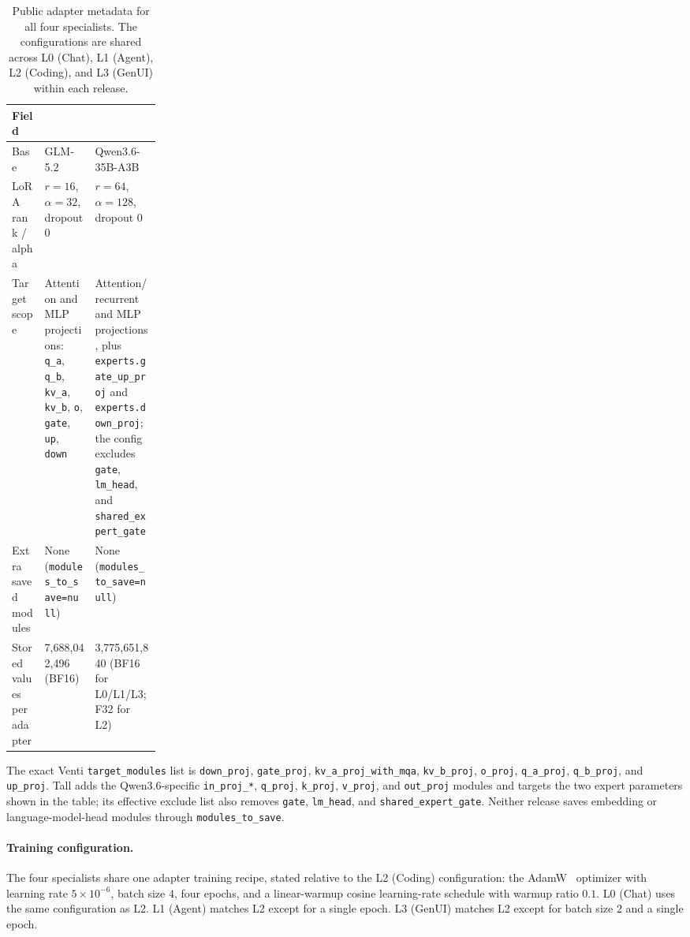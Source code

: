 \begin{table}[H]
\centering
\caption{Public adapter metadata for all four specialists. The configurations
are shared across L0 (Chat), L1 (Agent), L2 (Coding), and L3 (GenUI) within each
release.}
\label{tab:public_adapter_config}
\scriptsize
\begin{tabularx}{\linewidth}{@{}L{0.22\linewidth}YY@{}}
\toprule
Field & \venti{} & \tall{} \\
\midrule
Base & GLM-5.2 & Qwen3.6-35B-A3B \\
LoRA rank / alpha & $r=16$, $\alpha=32$, dropout $0$ & $r=64$, $\alpha=128$, dropout $0$ \\
Target scope & Attention and MLP projections: \texttt{q\_a}, \texttt{q\_b}, \texttt{kv\_a}, \texttt{kv\_b}, \texttt{o}, \texttt{gate}, \texttt{up}, \texttt{down} & Attention/recurrent and MLP projections, plus \texttt{experts.gate\_up\_proj} and \texttt{experts.down\_proj}; the config excludes \texttt{gate}, \texttt{lm\_head}, and \texttt{shared\_expert\_gate} \\
Extra saved modules & None (\texttt{modules\_to\_save=null}) & None (\texttt{modules\_to\_save=null}) \\
Stored values per adapter & 7,688,042,496 (BF16) & 3,775,651,840 (BF16 for L0/L1/L3; F32 for L2) \\
\bottomrule
\end{tabularx}
\end{table}

The exact Venti \texttt{target\_modules} list is
\texttt{down\_proj}, \texttt{gate\_proj},
\texttt{kv\_a\_proj\_with\_mqa}, \texttt{kv\_b\_proj}, \texttt{o\_proj},
\texttt{q\_a\_proj}, \texttt{q\_b\_proj}, and \texttt{up\_proj}. Tall adds
the Qwen3.6-specific \texttt{in\_proj\_*}, \texttt{q\_proj},
\texttt{k\_proj}, \texttt{v\_proj}, and \texttt{out\_proj} modules and
targets the two expert parameters shown in the table; its effective exclude
list also removes \texttt{gate}, \texttt{lm\_head}, and
\texttt{shared\_expert\_gate}. Neither release saves embedding or
language-model-head modules through \texttt{modules\_to\_save}.

\paragraph{Training configuration.} The four specialists share one adapter
training recipe, stated relative to the L2 (Coding) configuration: the
AdamW~\citep{adamw2019} optimizer with learning rate $5\times10^{-6}$, batch
size $4$, four epochs, and a linear-warmup cosine learning-rate schedule with
warmup ratio $0.1$. L0 (Chat) uses the same configuration as L2. L1 (Agent)
matches L2 except for a single epoch. L3 (GenUI) matches L2 except for batch
size $2$ and a single epoch.

